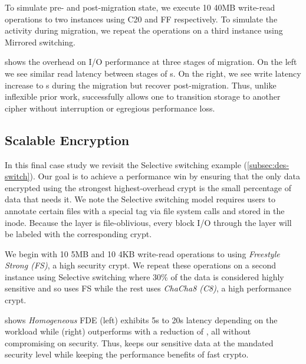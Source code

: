 To simulate pre- and post-migration state, we execute 10 40MB write-read
operations to two \sys instances using C20 and FF respectively. To simulate the
activity during migration, we repeat the operations on a third instance using
Mirrored switching.



 shows the overhead on I/O performance at three stages
of migration. On the left we see similar read latency between stages of
s. On the right, we see write latency increase to s during the
migration but recover post-migration. Thus, unlike inflexible prior work, \sys
successfully allows one to transition storage to another cipher without
interruption or egregious performance loss.


\subsection{Scalable Encryption}\label{subsec:usecase-scalable}

In this final case study we revisit the Selective switching example
(\cref{subsec:des-switch}). Our goal is to achieve a performance win by ensuring
that the only data encrypted using the strongest highest-overhead crypt is the
small percentage of data that needs it. We note the Selective switching model
requires users to annotate certain files with a special tag via file system
calls and stored in the inode. Because the \sys layer is file-oblivious, every
block I/O through the \sys layer will be labeled with the corresponding crypt.

We begin with 10 5MB and 10 4KB write-read operations to \sys using {\em
Freestyle Strong (FS)}, a high security crypt. We repeat these operations on a
second instance using Selective switching where 30\% of the data is considered
highly sensitive and so uses FS while the rest uses {\em ChaCha8 (C8)}, a high
performance crypt.



 shows {\em Homogeneous} FDE (left) exhibits 5s to
20s latency depending on the workload while \sys (right) outperforms with a
reduction of , all without compromising on security. Thus, \sys keeps our sensitive
data at the mandated security level while keeping the performance benefits of
fast crypto.
